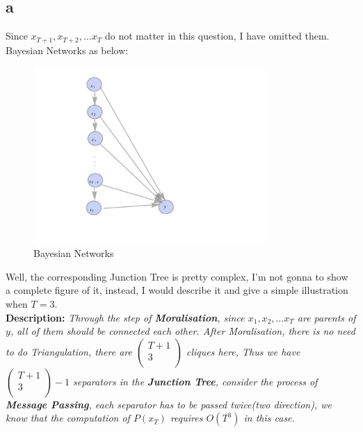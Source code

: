 \documentclass[12pt]{amsart}
\begin{document}
\subsection*{a}
Since $x_{T+1},x_{T+2},\ldots x_T$ do not matter in this question, I have omitted them.
Bayesian Networks as below:
\begin{figure}[H]
  \centering
  \includegraphics[width=0.8\textwidth]{BN_Q3.pdf}
  \caption{Bayesian Networks}
\end{figure}
Well, the corresponding Junction Tree is pretty complex, I'm not gonna to show a complete figure of it, instead, I would describe it and give a simple illustration when $T=3$.\\
\newline
\textbf{Description:}
\emph{Through the step of \textbf{Moralisation}, since $x_1,x_2,\ldots x_T$ are parents of $y$, all of them should be connected each other. After Moralisation, there is no need to do Triangulation, there are $\left(
\begin{array}{c}
 T+1 \\
 3 \\
\end{array}
\right)$
cliques here, Thus we have 
$\left(
\begin{array}{c}
 T+1 \\
 3 \\
\end{array}
\right)-1$
separators in the\textbf{ Junction Tree}, consider the process of \textbf{Message Passing}, each separator has to be passed twice(two direction), we know that the computation of $P(x_T)$ requires $O(T^3)$ in this case.}\\
\end{document}
